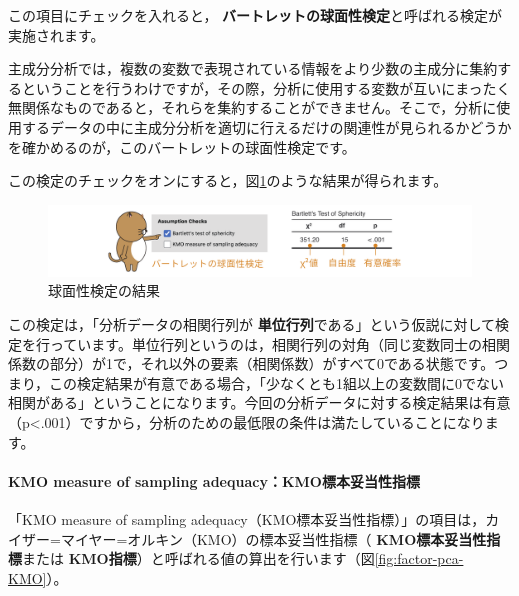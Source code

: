 \documentclass[
  12pt,
  a5jpaper,
  lualatex, ja=standard]{bxjsbook}
\renewcommand{\emph}[1]{\textbf{\color{emph} #1}}
\begin{document}
この項目にチェックを入れると，\emph{バートレットの球面性検定}と呼ばれる検定が実施されます。

主成分分析では，複数の変数で表現されている情報をより少数の主成分に集約するということを行うわけですが，その際，分析に使用する変数が互いにまったく無関係なものであると，それらを集約することができません。そこで，分析に使用するデータの中に主成分分析を適切に行えるだけの関連性が見られるかどうかを確かめるのが，このバートレットの球面性検定です。

この検定のチェックをオンにすると，図\ref{fig:factor-pca-bartlett}のような結果が得られます。

\begin{figure}[!ht]

{\centering \includegraphics[width=1\linewidth]{images/factor/pca-bartlett} 

}

\caption{球面性検定の結果}\label{fig:factor-pca-bartlett}
\end{figure}

この検定は，「分析データの相関行列が\emph{単位行列}である」という仮説に対して検定を行っています。単位行列というのは，相関行列の対角（同じ変数同士の相関係数の部分）が1で，それ以外の要素（相関係数）がすべて0である状態です。つまり，この検定結果が有意である場合，「少なくとも1組以上の変数間に0でない相関がある」ということになります。今回の分析データに対する検定結果は有意（p\textless.001）ですから，分析のための最低限の条件は満たしていることになります。

\hypertarget{kmo-measure-of-sampling-adequacykmoux6a19ux672cux59a5ux5f53ux6027ux6307ux6a19}{%
\paragraph*{KMO measure of sampling adequacy：KMO標本妥当性指標}\label{kmo-measure-of-sampling-adequacykmoux6a19ux672cux59a5ux5f53ux6027ux6307ux6a19}}

「KMO measure of sampling adequacy（KMO標本妥当性指標）」の項目は，カイザー=マイヤー=オルキン（KMO）の標本妥当性指標（\emph{KMO標本妥当性指標}または\emph{KMO指標}）と呼ばれる値の算出を行います（図\ref{fig:factor-pca-KMO}）。
\end{document}
